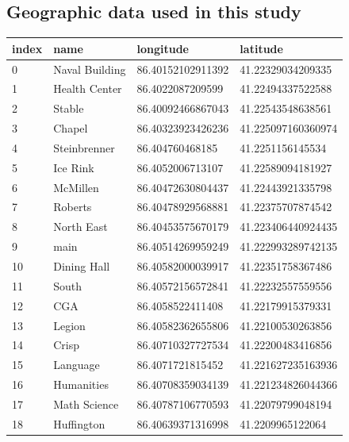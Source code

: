\documentclass[11pt]{article}
\begin{document}
\subsection{Geographic data used in this study}
\begin{table}[H]
\begin{tabular}{|l|l|l|l|}
\hline
index & name           & longitude         & latitude           \\ \hline
0     & Naval Building & 86.40152102911392 & 41.22329034209335  \\ \hline
1     & Health Center  & 86.4022087209599  & 41.22494337522588  \\ \hline
2     & Stable         & 86.40092466867043 & 41.22543548638561  \\ \hline
3     & Chapel         & 86.40323923426236 & 41.225097160360974 \\ \hline
4     & Steinbrenner   & 86.404760468185   & 41.2251156145534   \\ \hline
5     & Ice Rink       & 86.4052006713107  & 41.22589094181927  \\ \hline
6     & McMillen       & 86.40472630804437 & 41.22443921335798  \\ \hline
7     & Roberts        & 86.40478929568881 & 41.22375707874542  \\ \hline
8     & North East     & 86.40453575670179 & 41.223406440924435 \\ \hline
9     & main           & 86.40514269959249 & 41.222993289742135 \\ \hline
10    & Dining Hall    & 86.40582000039917 & 41.22351758367486  \\ \hline
11    & South          & 86.40572156572841 & 41.22232557559556  \\ \hline
12    & CGA            & 86.4058522411408  & 41.22179915379331  \\ \hline
13    & Legion         & 86.40582362655806 & 41.22100530263856  \\ \hline
14    & Crisp          & 86.40710327727534 & 41.22200483416856  \\ \hline
15    & Language       & 86.4071721815452  & 41.221627235163936 \\ \hline
16    & Humanities     & 86.40708359034139 & 41.221234826044366 \\ \hline
17    & Math Science   & 86.40787106770593 & 41.22079799048194  \\ \hline
18    & Huffington     & 86.40639371316998 & 41.2209965122064   \\ \hline

\end{tabular}
\end{table}
\end{document}

